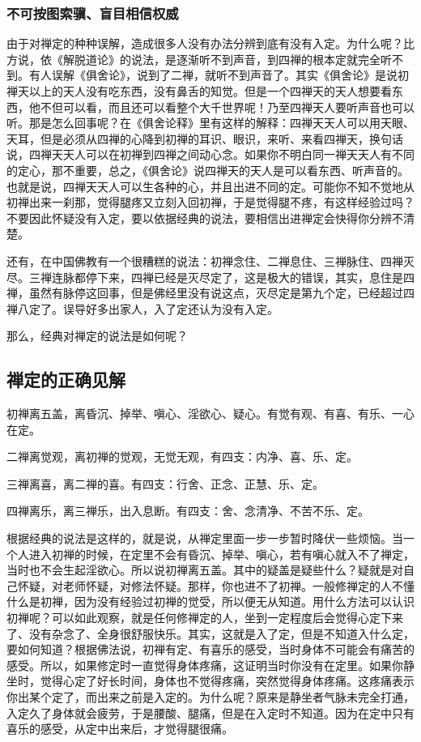 \documentclass{book}
\begin{document}
\subsubsection{不可按图索骥、盲目相信权威}

由于对禅定的种种误解，造成很多人没有办法分辨到底有没有入定。为什么呢？比方说，依《解脱道论》的说法，是逐渐听不到声音，到四禅的根本定就完全听不到。有人误解《俱舍论》，说到了二禅，就听不到声音了。其实《俱舍论》是说初禅天以上的天人没有吃东西，没有鼻舌的知觉。但是一个四禅天的天人想要看东西，他不但可以看，而且还可以看整个大千世界呢！乃至四禅天人要听声音也可以听。那是怎么回事呢？在《俱舍论释》里有这样的解释：四禅天天人可以用天眼、天耳，但是必须从四禅的心降到初禅的耳识、眼识，来听、来看四禅天，换句话说，四禅天天人可以在初禅到四禅之间动心念。如果你不明白同一禅天天人有不同的定心，那不重要，总之，《俱舍论》说四禅天的天人是可以看东西、听声音的。也就是说，四禅天天人可以生各种的心，并且出进不同的定。可能你不知不觉地从初禅出来一刹那，觉得腿疼又立刻入回初禅，于是觉得腿不疼，有这样经验过吗？不要因此怀疑没有入定，要以依据经典的说法，要相信出进禅定会快得你分辨不清楚。

还有，在中国佛教有一个很糟糕的说法：初禅念住、二禅息住、三禅脉住、四禅灭尽。三禅连脉都停下来，四禅已经是灭尽定了，这是极大的错误，其实，息住是四禅，虽然有脉停这回事，但是佛经里没有说这点，灭尽定是第九个定，已经超过四禅八定了。误导好多出家人，入了定还认为没有入定。

那么，经典对禅定的说法是如何呢？

\subsection{禅定的正确见解}

初禅离五盖，离昏沉、掉举、嗔心、淫欲心、疑心。有觉有观、有喜、有乐、一心在定。

二禅离觉观，离初禅的觉观，无觉无观，有四支：内净、喜、乐、定。

三禅离喜，离二禅的喜。有四支：行舍、正念、正慧、乐、定。

四禅离乐，离三禅乐，出入息断。有四支：舍、念清净、不苦不乐、定。

根据经典的说法是这样的，就是说，从禅定里面一步一步暂时降伏一些烦恼。当一个人进入初禅的时候，在定里不会有昏沉、掉举、嗔心，若有嗔心就入不了禅定，当时也不会生起淫欲心。所以说初禅离五盖。其中的疑盖是疑些什么？疑就是对自己怀疑，对老师怀疑，对修法怀疑。那样，你也进不了初禅。一般修禅定的人不懂什么是初禅，因为没有经验过初禅的觉受，所以便无从知道。用什么方法可以认识初禅呢？可以如此观察，就是任何修禅定的人，坐到一定程度后会觉得心定下来了、没有杂念了、全身很舒服快乐。其实，这就是入了定，但是不知道入什么定，要如何知道？根据佛法说，初禅有定、有喜乐的感受，当时身体不可能会有痛苦的感受。所以，如果修定时一直觉得身体疼痛，这证明当时你没有在定里。如果你静坐时，觉得心定了好长时间，身体也不觉得疼痛，突然觉得身体疼痛。这疼痛表示你出某个定了，而出来之前是入定的。为什么呢？原来是静坐者气脉未完全打通，入定久了身体就会疲劳，于是腰酸、腿痛，但是在入定时不知道。因为在定中只有喜乐的感受，从定中出来后，才觉得腿很痛。
\end{document}
